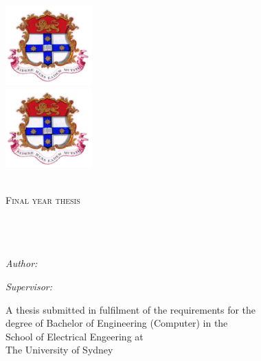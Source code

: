 \documentclass[a4paper]{report}
\title{\thesisTitle{}}
\author{\studentName{}}
\date{\thesisDate{}}
\begin{document}
\begin{titlepage}
\begin{center}

\ifpdf
    \includegraphics[width=0.25\textwidth]{sydney_uni_coat_of_arms.png}\\[1cm]
\else
    \includegraphics[width=0.25\textwidth]{sydney_uni_coat_of_arms.eps  }\\[1cm]
\fi

\textsc{\LARGE \universityName{}}\\[1.5cm]

\textsc{\Large Final year thesis}\\[0.5cm]

\HRule \\[0.4cm]
{\huge \bfseries \thesisTitle{}}\\[0.4cm]
\HRule \\[1.5cm]

\begin{minipage}{0.4\textwidth}
    \begin{flushleft} \large
        \emph{Author:}\\
        \studentName{}
    \end{flushleft}
\end{minipage}
\begin{minipage}{0.4\textwidth}
    \begin{flushright} \large
        \emph{Supervisor:} \\
        \supervisorName{}
    \end{flushright}
\end{minipage}

\vfill

{\large A thesis submitted in fulfilment of the requirements for the\\
degree of Bachelor of Engineering (Computer) in the \\
School of Electrical Engeering at\\
The University of Sydney}

\vfill

{\large \thesisDate{}}

\end{center}
\end{titlepage}
\end{document}
